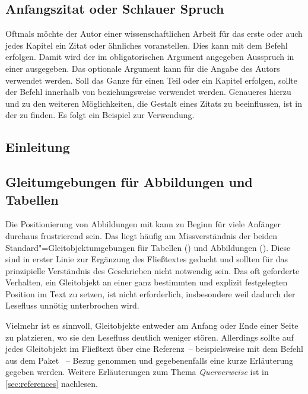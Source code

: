 \documentclass[%
  english,ngerman,%
  cdgeometry=no,DIV=12,automark,%
]{tudscrartcl}
\begin{document}
\section{Anfangszitat oder Schlauer Spruch}
\renewcommand*\dictumwidth{.4\textwidth}%
%
\bigskip\noindent
Oftmals möchte der Autor einer wissenschaftlichen Arbeit für das erste oder 
auch jedes Kapitel ein Zitat oder ähnliches voranstellen. Dies kann mit dem 
Befehl  erfolgen. Damit wird 
der im obligatorischen Argument angegeben Ausspruch in einer  
ausgegeben. Das optionale Argument kann für die Angabe des Autors verwendet 
werden. Soll das Ganze für einen Teil oder ein Kapitel erfolgen, sollte der 
Befehl  innerhalb von  beziehungsweise 
 verwendet werden. Genaueres hierzu und zu den 
weiteren Möglichkeiten, die Gestalt eines Zitats zu beeinflussen, ist in der 
 zu finden. Es folgt ein Beispiel zur 
Verwendung.
%
\begin{Hint}
\chapter{Einleitung}

\end{Hint}



\section{Gleitumgebungen für Abbildungen und Tabellen}
\label{sec:floats}
Die Positionierung von Abbildungen mit  kann zu Beginn für viele 
Anfänger durchaus frustrierend sein. Das liegt häufig am Missverständnis der 
beiden Standard"=Gleitobjektumgebungen für Tabellen () und 
Abbildungen (). Diese sind in erster Linie zur Ergänzung 
des Fließtextes gedacht und sollten für das prinzipielle Verständnis des 
Geschrieben nicht notwendig sein. Das oft geforderte Verhalten, ein Gleitobjekt 
an einer ganz bestimmten und explizit festgelegten Position im Text zu setzen, 
ist nicht erforderlich, insbesondere weil dadurch der Lesefluss unnötig 
unterbrochen wird. 

Vielmehr ist es sinnvoll, Gleitobjekte entweder am Anfang oder Ende einer Seite 
zu platzieren, wo sie den Lesefluss deutlich weniger stören. Allerdings sollte 
auf jedes Gleitobjekt im Fließtext über eine Referenz~-- beispielsweise mit dem 
Befehl  aus dem Paket ~-- Bezug genommen und 
gegebenenfalls eine kurze Erläuterung gegeben werden. Weitere Erläuterungen zum 
Thema \emph{Querverweise} ist in \autoref{sec:references} nachlesen.
\end{document}

